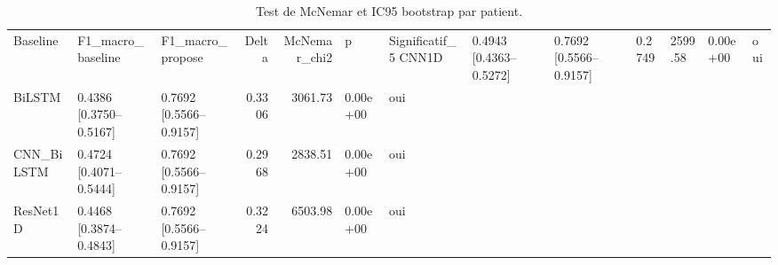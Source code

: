 \begin{table}
\caption{Test de McNemar et IC95 bootstrap par patient.}
\label{tab:stats}
\begin{tabular}{lllrrll}
\toprule
Baseline & F1_macro_baseline & F1_macro_propose & Delta & McNemar_chi2 & p & Significatif_5%
\midrule
CNN1D & 0.4943 [0.4363–0.5272] & 0.7692 [0.5566–0.9157] & 0.2749 & 2599.58 & 0.00e+00 & oui \\
BiLSTM & 0.4386 [0.3750–0.5167] & 0.7692 [0.5566–0.9157] & 0.3306 & 3061.73 & 0.00e+00 & oui \\
CNN_BiLSTM & 0.4724 [0.4071–0.5444] & 0.7692 [0.5566–0.9157] & 0.2968 & 2838.51 & 0.00e+00 & oui \\
ResNet1D & 0.4468 [0.3874–0.4843] & 0.7692 [0.5566–0.9157] & 0.3224 & 6503.98 & 0.00e+00 & oui \\
\bottomrule
\end{tabular}
\end{table}

